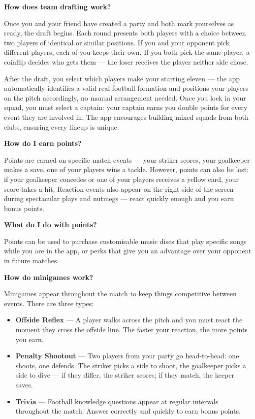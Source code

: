 \documentclass[12pt]{article}
\begin{document}
\textbf{How does team drafting work?}

Once you and your friend have created a party and both mark yourselves as ready, 
the draft begins. Each round presents both players with a choice between two 
players of identical or similar positions. If you and your opponent pick 
different players, each of you keeps their own. If you both pick the same player, 
a coinflip decides who gets them — the loser receives the player neither side chose.

After the draft, you select which players make your starting eleven — the app 
automatically identifies a valid real football formation and positions your 
players on the pitch accordingly, no manual arrangement needed. Once you lock 
in your squad, you must select a captain: your captain earns you double points 
for every event they are involved in. The app encourages building mixed squads 
from both clubs, ensuring every lineup is unique.

\textbf{How do I earn points?}

Points are earned on specific match events — your striker scores, your 
goalkeeper makes a save, one of your players wins a tackle. However, points 
can also be lost: if your goalkeeper concedes or one of your players receives 
a yellow card, your score takes a hit. Reaction events also appear on the right 
side of the screen during spectacular plays and nutmegs — react quickly enough 
and you earn bonus points.

\textbf{What do I do with points?}

Points can be used to purchase customisable music discs that play specific songs 
while you are in the app, or perks that give you an advantage over your opponent 
in future matches.

\textbf{How do minigames work?}

Minigames appear throughout the match to keep things competitive between events. 
There are three types:

\begin{itemize}
    \item \textbf{Offside Reflex} --- A player walks across the pitch and you must 
    react the moment they cross the offside line. The faster your reaction, the 
    more points you earn.

    \item \textbf{Penalty Shootout} --- Two players from your party go head-to-head: 
    one shoots, one defends. The striker picks a side to shoot, the goalkeeper picks 
    a side to dive — if they differ, the striker scores; if they match, the keeper saves.

    \item \textbf{Trivia} --- Football knowledge questions appear at regular intervals 
    throughout the match. Answer correctly and quickly to earn bonus points.
\end{itemize}
\end{document}
